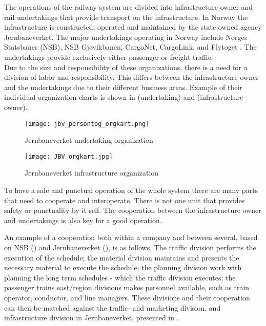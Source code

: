 The operations of the railway system are divided into infrastructure owner and 
rail undertakings that provide transport on the infrastructure. In Norway the 
infrastructure is constructed, operated and maintained by the state owned 
agency Jernbaneverket. The major undertakings operating in Norway  include 
Norges Statsbaner (NSB), NSB Gjøvikbanen, CargoNet, CargoLink, and Flytoget \cite{ wiki:NorwegianRailway}. The undertakings provide exclusively either passenger 
or freight traffic.\\

Due to the size and responsibility of these organizations, there is a need for 
a division of labor and responsibility. This differs between the 
infrastructure owner and the undertakings due to their different business 
areas. Example of their individual organization charts is shown in  (undertaking) and  (infrastructure owner).

\begin{figure}[!htbp]
	\texttt{[image: jbv\_persontog\_orgkart.png]}
	\caption[Jernbaneverket undertaking organization]{Jernbaneverket undertaking organization \cite{sintefPresis}}
	\label{fig:jbv_undertaking_org_map}
\end{figure}

\begin{figure}[!htbp]
	\texttt{[image: JBV\_orgkart.jpg]}
	\caption[Jernbaneverket infrastructure organization]{Jernbaneverket infrastructure organization \cite{jernbaneverketOrganisasjon}}
	\label{fig:jbv_infrastructure_org_map}
\end{figure}

To have a safe and punctual operation of the whole system there are
many parts that need to cooperate and interoperate. There is not one unit that
provides safety or punctuality by it self. The cooperation between the 
infrastructure owner and undertakings is also key for a good operation. 

An example of a cooperation both within a company and between several, based on
NSB () and Jernbaneverket (), is as follows. The traffic division 
performs the execution of the schedule; the material division maintains and
presents the necessary material to execute the schedule; the planning division
work with planning the long term schedules - which the traffic division
executes; the passenger trains east/region divisions makes personnel 
available, such as train operator, conductor, and line managers. These 
divisions and their cooperation can then be matched against the traffic- and 
marketing division, and infrastructure division in Jernbaneverket, presented in
.\\

